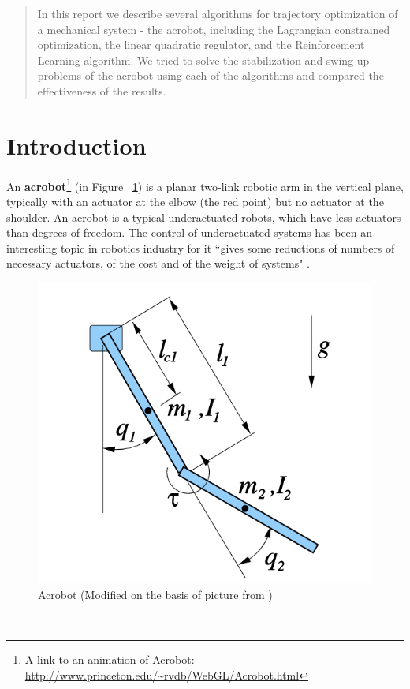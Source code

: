 \begin{abstract}
\quad In this report we describe several algorithms for trajectory optimization of a mechanical system - the acrobot, including the Lagrangian constrained optimization, the linear quadratic regulator, and the Reinforcement Learning algorithm. We tried to solve the stabilization and swing-up problems of the acrobot using each of the algorithms and compared the effectiveness of the results.
\end{abstract}

\section{Introduction}
\quad An \textbf{acrobot}\footnote{A link to an animation of Acrobot: \url{http://www.princeton.edu/~rvdb/WebGL/Acrobot.html} } (in Figure ~\ref{fig:acrobot}) is a planar two-link robotic arm in the vertical plane, typically with an actuator at the elbow (the red point) but no actuator at the shoulder. An acrobot is a typical underactuated robots, which have less actuators than degrees of freedom. The control of underactuated systems has been an interesting topic in robotics industry for it ``gives some reductions of numbers of necessary actuators, of the cost and of the weight of systems" \cite{mingcong}. \\
\begin{figure}[h!]
\centering
\includegraphics[width=0.45\linewidth]{parameters.png}
\caption{Acrobot (Modified on the basis of picture from \cite{tedrake})}
\label{fig:acrobot}
\end{figure} \\
